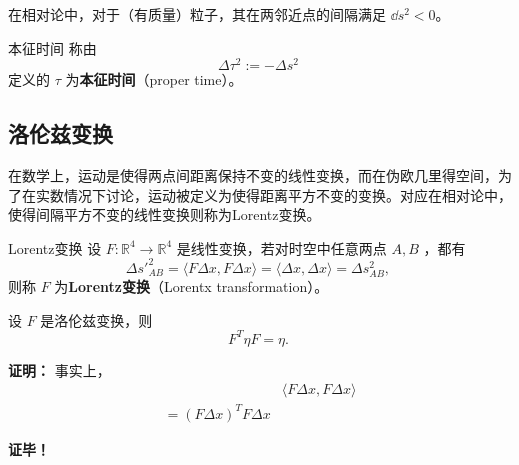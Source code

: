 在相对论中，对于（有质量）粒子，其在两邻近点的间隔满足 $\dd s^2<0$。
\begin{definition}{本征时间}
称由
\begin{equation}
\Delta \tau^2:=-\Delta s^2~
\end{equation}
定义的 $\tau$ 为\textbf{本征时间}（proper time）。
\end{definition}

\subsection{洛伦兹变换}
在数学上，运动是使得两点间距离保持不变的线性变换，而在伪欧几里得空间，为了在实数情况下讨论，运动被定义为使得距离平方不变的变换。对应在相对论中，使得间隔平方不变的线性变换则称为Lorentz变换。
\begin{definition}{Lorentz变换}
设 $F:\mathbb R^4\rightarrow\mathbb R^4$ 是线性变换，若对时空中任意两点 $A,B$ ，都有
\begin{equation}
\Delta s'^2_{AB}=\langle F\Delta x,F\Delta x\rangle=\langle \Delta x,\Delta x\rangle=\Delta s^2_{AB},~
\end{equation}
则称 $F$ 为\textbf{Lorentz变换}（Lorentx transformation）。
\end{definition}

\begin{theorem}{}
设 $F$ 是洛伦兹变换，则
\begin{equation}
F^T\eta F=\eta.~
\end{equation} 
\end{theorem}

\textbf{证明：}
事实上，
\begin{equation}
\begin{aligned}
&\langle F\Delta x,F\Delta x\rangle\\
=(F\Delta x)^T  F\Delta x&
\end{aligned}
\end{equation}

\textbf{证毕！}




















